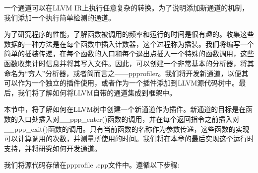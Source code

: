 
一个通道可以在LLVM IR上执行任意复杂的转换。为了说明添加新通道的机制，我们添加一个执行简单检测的通道。

为了研究程序的性能，了解函数被调用的频率和运行的时间是很有趣的。收集这些数据的一种方法是在每个函数中插入计数器，这个过程称为插装。我们将编写一个简单的插装传递，在每个函数的入口和每个退出点插入一个特殊的函数调用，这些函数收集计时信息并将其写入文件。因此，可以创建一个非常基本的分析器，将其命名为“穷人”分析器，或者简而言之——ppprofiler。我们将开发新通道，以便其可以作为一个独立的插件使用，或者作为一个插件添加到LLVM源代码树中。最后，我们将了解如何将LLVM自带的通道集成到框架中。


本节中，将了解如何在LLVM树中创建一个新通道作为插件。新通道的目标是在函数的入口处插入对\_\_ppp\_enter()函数的调用，并在每个返回指令之前插入对\_\_ppp\_exit()函数的调用。只有当前函数的名称作为参数传递，这些函数的实现可以计算调用的次数，并测量所使用的时间。我们将在本章的最后实现这个运行时支持，并将研究如何开发通道。

我们将源代码存储在ppprofile .cpp文件中。遵循以下步骤:

